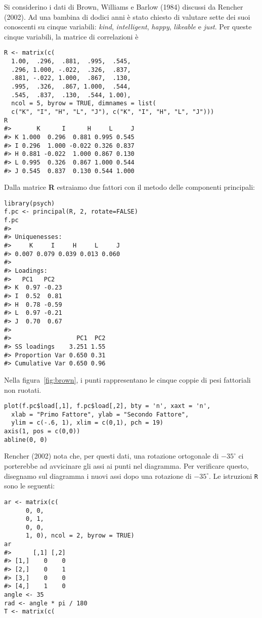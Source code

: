 \begin{exmp} Si considerino i dati di Brown, Williams e Barlow (1984) discussi da Rencher (2002).  Ad una bambina di dodici anni è stato chiesto di valutare sette dei suoi conoscenti su cinque variabili: {\it kind}, {\it intelligent}, {\it happy}, {\it likeable} e {\it just}. Per queste cinque variabili, la matrice di correlazioni è
\begin{lstlisting}
R <- matrix(c( 
  1.00,  .296,  .881,  .995,  .545, 
  .296, 1.000, -.022,  .326,  .837, 
  .881, -.022, 1.000,  .867,  .130, 
  .995,  .326,  .867, 1.000,  .544, 
  .545,  .837,  .130,  .544, 1.00), 
  ncol = 5, byrow = TRUE, dimnames = list( 
  c("K", "I", "H", "L", "J"), c("K", "I", "H", "L", "J"))) 
R
#>       K      I      H     L     J
#> K 1.000  0.296  0.881 0.995 0.545
#> I 0.296  1.000 -0.022 0.326 0.837
#> H 0.881 -0.022  1.000 0.867 0.130
#> L 0.995  0.326  0.867 1.000 0.544
#> J 0.545  0.837  0.130 0.544 1.000
\end{lstlisting}
Dalla matrice \textbf{R} estraiamo due fattori con il metodo delle componenti principali:
\begin{lstlisting}
library(psych)
f.pc <- principal(R, 2, rotate=FALSE) 
f.pc
#> 
#> Uniquenesses:
#>     K     I     H     L     J 
#> 0.007 0.079 0.039 0.013 0.060 
#> 
#> Loadings:
#>   PC1   PC2  
#> K  0.97 -0.23
#> I  0.52  0.81
#> H  0.78 -0.59
#> L  0.97 -0.21
#> J  0.70  0.67
#> 
#>                  PC1  PC2
#> SS loadings    3.251 1.55
#> Proportion Var 0.650 0.31
#> Cumulative Var 0.650 0.96
\end{lstlisting}
Nella figura~\ref{fig:brown}, i punti rappresentano le cinque coppie di pesi
fattoriali non ruotati.  
\begin{lstlisting}
plot(f.pc$load[,1], f.pc$load[,2], bty = 'n', xaxt = 'n', 
  xlab = "Primo Fattore", ylab = "Secondo Fattore",
  ylim = c(-.6, 1), xlim = c(0,1), pch = 19)
axis(1, pos = c(0,0))
abline(0, 0)  
\end{lstlisting}
Rencher (2002) nota che, per questi dati, una rotazione ortogonale  di $-35^{\circ}$ ci porterebbe ad avvicinare gli assi ai punti nel diagramma. Per verificare questo, disegnamo sul diagramma i nuovi assi dopo una rotazione di  $-35^{\circ}$. Le istruzioni \texttt{R} sono le seguenti:
\begin{lstlisting}
ar <- matrix(c(
      0, 0,
      0, 1,
      0, 0,
      1, 0), ncol = 2, byrow = TRUE)
ar
#>      [,1] [,2]
#> [1,]    0    0
#> [2,]    0    1
#> [3,]    0    0
#> [4,]    1    0
angle <- 35
rad <- angle * pi / 180
T <- matrix(c(

\end{lstlisting}
\end{exmp}
